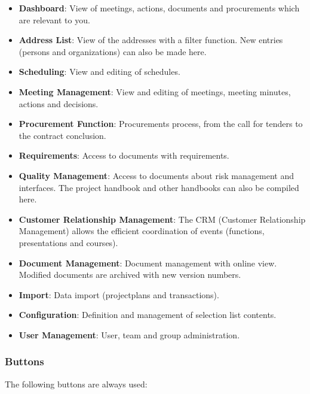 \begin{itemize}
\item
\textbf{Dashboard}: View of meetings, actions, documents and procurements which are relevant to you.
\item
\textbf{Address List}: View of the addresses with a filter function. New entries (persons and organizations) can also be made here.
\item
\textbf{Scheduling}: View and editing of schedules.
\item
\textbf{Meeting Management}: View and editing of meetings, meeting minutes, actions and 
decisions.
\item
\textbf{Procurement Function}: Procurements process, from the call for tenders to the contract conclusion.
\item
\textbf{Requirements}: Access to documents with requirements.
\item
\textbf{Quality Management}: Access to documents about risk management and interfaces. The project handbook and other handbooks can also be compiled here.
\item
\textbf{Customer Relationship Management}: The CRM (Customer Relationship Management) allows the efficient coordination of events (functions, presentations and courses).
\item
\textbf{Document Management}: Document management with online view. Modified documents are archived with new version numbers.
\item
\textbf{Import}: Data import (projectplans and transactions).
\item
\textbf{Configuration}: Definition and management of selection list contents.
\item
\textbf{User Management}: User, team and group administration.
\end{itemize}


\subsubsection{Buttons}

The following buttons are always used:

\vspace{\baselineskip}


